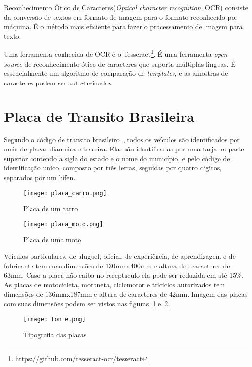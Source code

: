 Reconhecimento Ótico de Caracteres(\emph{Optical character recognition}, OCR)
consiste da conversão de textos em formato de imagem para o formato reconhecido
por máquina. É o método mais eficiente para fazer o processamento de imagem para
texto.~\cite{mohit2015designing}

Uma ferramenta conhecida de OCR é o
Tesseract\footnote{https://github.com/tesseract-ocr/tesseract}. É uma ferramenta
\emph{open source} de reconhecimento ótico de caracteres que suporta múltiplas
linguas.  É essencialmente um algoritmo de comparação de \emph{templates}, e as
amostras de caracteres podem ser auto-treinados.~\cite{ho2016intelligent}

\section{Placa de Transito Brasileira}
\label{sec:placabr}

Segundo o código de transito brasileiro~\cite{brasil1997lei}, todos os veículos
são identificados por meio de placas dianteira e traseira. Elas são
identificadas por uma tarja na parte superior contendo a sigla do estado e o
nome do município, e pelo código de identificação unico, composto por três
letras, seguidas por quatro digitos, separados por um hífen. 

\begin{figure}[H]
		\centering
		\texttt{[image: placa\_carro.png]}
		\caption{Placa de um carro}
		\label{fig:placa_carro}
\end{figure}

\begin{figure}[H]
		\centering
		\texttt{[image: placa\_moto.png]}
		\caption{Placa de uma moto}
		\label{fig:placa_moto}
\end{figure}

Veículos particulares, de aluguel, oficial, de experiência, de aprendizagem e de
fabricante tem suas dimensões de 130mmx400mm e altura dos caracteres de 63mm.
Caso a placa não caiba no receptáculo ela pode ser reduzida em até 15\%. As
placas de motocicleta, motoneta, ciclomotor e triciclos autorizados tem
dimensões de 136mmx187mm e altura de caracteres de 42mm. Imagem das placas com
suas dimensões podem ser vistos nas figuras~\ref{fig:placa_carro}
e~\ref{fig:placa_moto}. 

\begin{figure}[H]
		\centering
		\texttt{[image: fonte.png]}
		\caption{Tipografia das placas}
		\label{fig:tipografia}
\end{figure}



